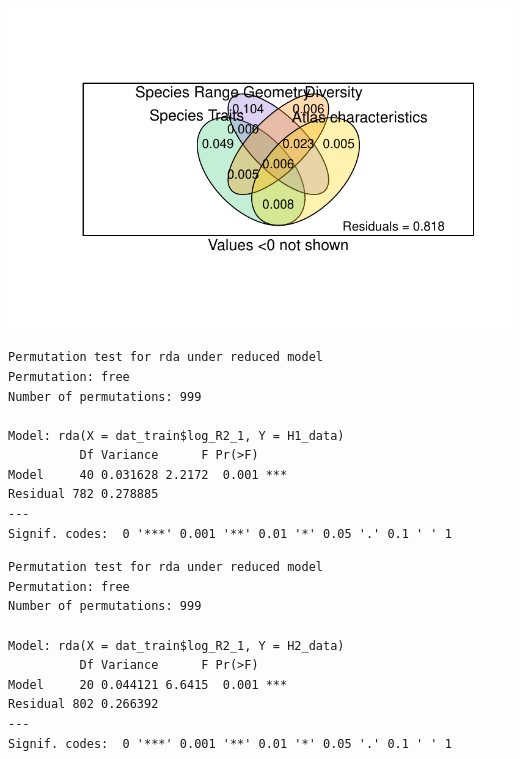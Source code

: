 \documentclass[
  letterpaper,
  DIV=11,
  numbers=noendperiod]{scrreprt}
\newenvironment{Shaded}{\begin{snugshade}}{\end{snugshade}}
\newcommand{\CommentTok}[1]{\textcolor[rgb]{0.37,0.37,0.37}{#1}}
\newcommand{\FunctionTok}[1]{\textcolor[rgb]{0.28,0.35,0.67}{#1}}
\newcommand{\NormalTok}[1]{\textcolor[rgb]{0.00,0.23,0.31}{#1}}
\newcommand{\SpecialCharTok}[1]{\textcolor[rgb]{0.37,0.37,0.37}{#1}}
\begin{document}
\includegraphics{05_VarPart_files/figure-pdf/var-part-vegan-LR2-1.pdf}

\begin{Shaded}
\end{Shaded}

\begin{verbatim}
Permutation test for rda under reduced model
Permutation: free
Number of permutations: 999

Model: rda(X = dat_train$log_R2_1, Y = H1_data)
          Df Variance      F Pr(>F)    
Model     40 0.031628 2.2172  0.001 ***
Residual 782 0.278885                  
---
Signif. codes:  0 '***' 0.001 '**' 0.01 '*' 0.05 '.' 0.1 ' ' 1
\end{verbatim}

\begin{Shaded}
\end{Shaded}

\begin{verbatim}
Permutation test for rda under reduced model
Permutation: free
Number of permutations: 999

Model: rda(X = dat_train$log_R2_1, Y = H2_data)
          Df Variance      F Pr(>F)    
Model     20 0.044121 6.6415  0.001 ***
Residual 802 0.266392                  
---
Signif. codes:  0 '***' 0.001 '**' 0.01 '*' 0.05 '.' 0.1 ' ' 1
\end{verbatim}
\end{document}
